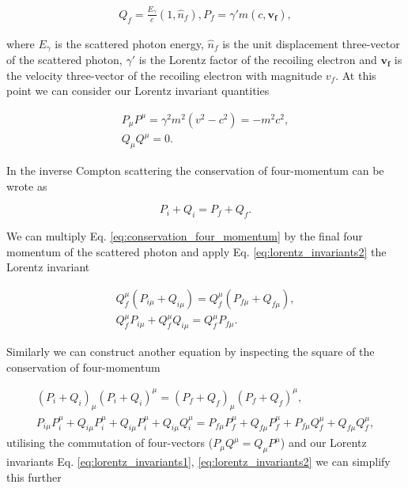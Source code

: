 \documentclass[../main.tex]{subfiles}
\begin{document}
\begin{align}
Q_{f} = \frac{E_{\gamma}}{c}\left(1,\hat{n}_{f}\right),
P_{f} = \gamma' m\left(c,\boldsymbol{v_{f}}\right),
\label{eq:final_four_vectors}
\end{align}

where $E_{\gamma}$ is the scattered photon energy, $\hat{n}_{f}$ is the unit displacement three-vector of the scattered photon, $\gamma'$ is the Lorentz factor of the recoiling electron and $\boldsymbol{v_{f}}$ is the velocity three-vector of the recoiling electron with magnitude $v_{f}$. At this point we can consider our Lorentz invariant quantities 

\begin{align}
P_{\mu}P^{\mu} = \gamma^{2}m^{2}\left(v^{2}-c^{2}\right) = -m^{2}c^{2},
\label{eq:lorentz_invariants1} \\
Q_{\mu}Q^{\mu} = 0.
\label{eq:lorentz_invariants2}
\end{align}

In the inverse Compton scattering the conservation of four-momentum can be wrote as

\begin{equation}
P_{i} + Q_{i} = P_{f} + Q_{f}.
\label{eq:conservation_four_momentum}
\end{equation}

We can multiply Eq. \ref{eq:conservation_four_momentum} by the final four momentum of the scattered photon and apply Eq. \ref{eq:lorentz_invariants2} the Lorentz invariant 

\begin{align}
Q_{f}^{\mu}\left(P_{i\mu} + Q_{i\mu}\right) = Q_{f}^{\mu}\left(P_{f\mu} + Q_{f\mu}\right), \\
Q_{f}^{\mu}P_{i\mu}+Q_{f}^{\mu}Q_{i\mu} = Q_{f}^{\mu}P_{f\mu}.
\label{eq:apply_photon_pfinal}
\end{align}
 
Similarly we can construct another equation by inspecting the square of the conservation of four-momentum

\begin{align}
\left(P_{i}+Q_{i}\right)_{\mu}\left(P_{i}+Q_{i}\right)^{\mu} = \left(P_{f}+Q_{f}\right)_{\mu}\left(P_{f}+Q_{f}\right)^{\mu}, \\
P_{i\mu}P_{i}^{\mu}+Q_{i\mu}P_{i}^{\mu}+Q_{i\mu}P_{i}^{\mu}+Q_{i\mu}Q_{i}^{\mu} = P_{f\mu}P_{f}^{\mu}+Q_{f\mu}P_{f}^{\mu}+P_{f\mu}Q_{f}^{\mu}+Q_{f\mu}Q_{f}^{\mu},
\label{eq:apply_conservation_squared}
\end{align}
utilising the commutation of four-vectors ($P_{\mu}Q^{\mu} = Q_{\mu}P^{\mu}$) and our Lorentz invariants Eq. \ref{eq:lorentz_invariants1}, \ref{eq:lorentz_invariants2} we can simplify this further
\end{document}
